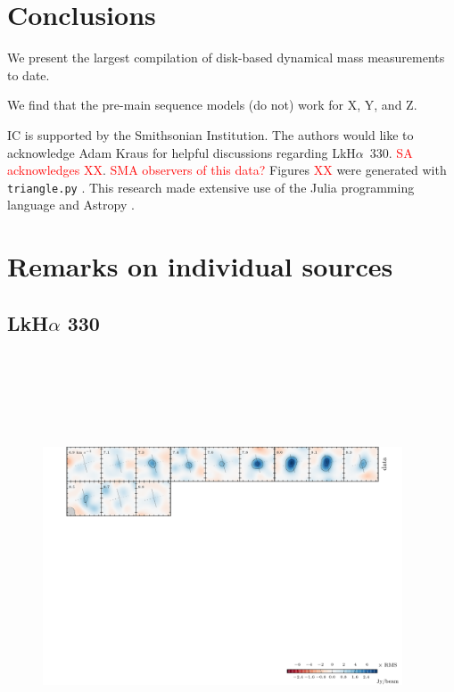\documentclass[twocolumn]{aastex6}
\newcommand{\todo}[1]{ \textcolor{red}{#1}}
\begin{document}
\section{Conclusions}

We present the largest compilation of disk-based dynamical mass measurements to date.

We find that the pre-main sequence models (do not) work for X, Y, and Z.

\acknowledgments
IC is supported by the Smithsonian Institution. The authors would like to acknowledge Adam Kraus for helpful discussions regarding LkH$\alpha$~330. \todo{SA acknowledges XX}. \todo{SMA observers of this data?}  Figures \todo{XX} were generated with \texttt{triangle.py} \citep{foreman-mackey14}. This research made extensive use of the Julia programming language \citep{julia12} and Astropy \citep{astropy13}.




\appendix

\section{Remarks on individual sources}

\subsection{LkH$\alpha$ 330}
\begin{figure}[htb]
\begin{center}
  \includegraphics[draft, width=0.95\textwidth, height=5in]{LkHa330.pdf}
  \end{center}
\end{figure}
\end{document}
